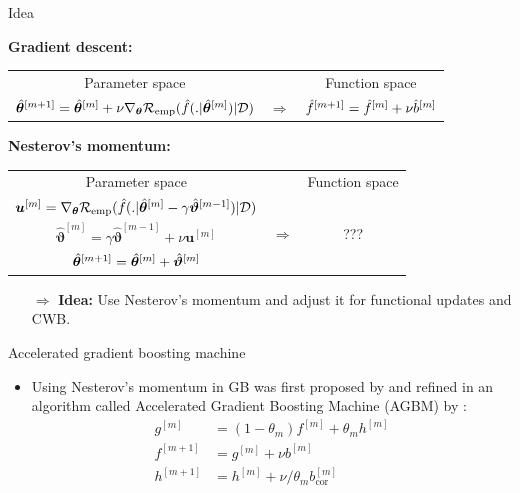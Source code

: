 \documentclass[t,10pt]{beamer}
\begin{document}
\begin{frame}{Idea}

  \textbf{Gradient descent:}

  \vspace{0.2cm}
  {\small
  \begin{tabular}{ccc}
    Parameter space & & Function space \\[0.3cm]
    $\hat{\bm{\theta}}^{[m+1]} = \hat{\bm{\theta}}^{[m]} + \nu \nabla_{\bm{\theta}}\mathcal{R}_{\text{emp}}(\hat{f}(. | \hat{\bm{\theta}}^{[m]}) | \mathcal{D})$ & $\Rightarrow$ & $\hat{f}^{[m+1]} = \hat{f}^{[m]} + \nu \hat{b}^{[m]}$
  \end{tabular}}
  \vspace{0.4cm}

  \textbf{Nesterov's momentum:}

  \vspace{0.2cm}
  {\small
  \begin{tabular}{ccc}
    Parameter space & & Function space \\[0.3cm]
    $\bm{u}^{[m]} = \nabla_{\bm{\theta}}\mathcal{R}_{\text{emp}}(\hat{f}(. | \hat{\bm{\theta}}^{[m]} - \gamma \hat{\bm{\vartheta}}^{[m-1]}) | \mathcal{D})$ &  & \\
    $\hat{\bm{\vartheta}}^{[m]} = \gamma \hat{\bm{\vartheta}}^{[m-1]} + \nu \bm{u}^{[m]}$ & $\Rightarrow$ & ??? \\
    $\hat{\bm{\theta}}^{[m+1]} = \hat{\bm{\theta}}^{[m]} + \hat{\bm{\vartheta}}^{[m]}$ & &
  \end{tabular}}
  \vspace{0.2cm}

  \begin{itemize}
  \item[$\Rightarrow$] \textbf{Idea:} Use Nesterov's momentum and adjust it for functional updates and CWB.
  \end{itemize}

\end{frame}

\begin{frame}{Accelerated gradient boosting machine}
  \begin{itemize}
    \item
      Using Nesterov's momentum in GB was first proposed by \cite{biau2019accelerated} and refined in an algorithm called Accelerated Gradient Boosting Machine (AGBM) by \cite{lu2020accelerating}:
      \begin{align*}
      g^{[m]} &= (1 - \theta_m) f^{[m]} + \theta_m h^{[m]}\\
      f^{[m+1]} &= g^{[m]} + \nu b^{[m]} \\
      h^{[m+1]} &= h^{[m]} + \nu / \theta_m b^{[m]}_{\text{cor}}
      \end{align*}
  \end{itemize}
\end{frame}
\end{document}
